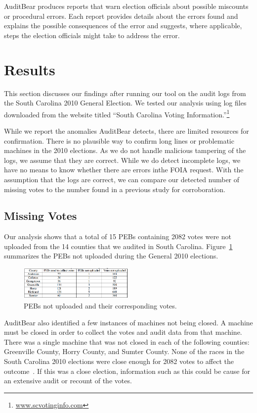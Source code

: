 \documentclass[letterpaper,twocolumn,10pt]{article}
\begin{document}
AuditBear produces reports that warn election officials about possible miscounts
or procedural errors. Each report provides details about the errors found and
explains the possible consequences of the error and suggests, where applicable,
steps the election officials might take to address the error.

\section{Results}
This section discusses our findings after running our tool on the audit logs
from the South Carolina 2010 General Election. We tested our analysis using log
files downloaded from the website titled “South Carolina Voting
Information.”\footnote{\url{www.scvotinginfo.com}} 

While we report the anomalies AuditBear detects, there are limited resources for 
confirmation. There is no plausible way to confirm long lines or problematic 
machines in the 2010 elections. As we do not handle malicious tampering of the 
logs, we assume that they are correct. While we do detect incomplete logs, we 
have no means to know whether there are errors inthe FOIA request. With the 
assumption that the logs are correct, we can compare our detected number of 
missing votes to the number found in a previous study for corroboration.  

\subsection{Missing Votes}
Our analysis shows that a total of 15 PEBs containing 2082 votes were not
uploaded from the 14 counties that we audited in South
Carolina. Figure~\ref{fig:pebs-not-uploaded} summarizes the PEBs not uploaded
during the General 2010 elections.  

\begin{figure}[htbp]
\begin{center}
    \includegraphics[width=0.5\textwidth,height=0.1\textheight]{PEBsNotUploaded1.eps}
\end{center}
\caption{PEBs not uploaded and their corresponding votes.}
\label{fig:pebs-not-uploaded}
\end{figure}

AuditBear also identified a few instances of machines not being closed. A
machine must be closed in order to collect the votes and audit data from that
machine. There was a single machine that was not closed in each of the following
counties: Greenville County, Horry County, and Sumter County. None of the races in 
the South Carolina 2010 elections were close enough for 2082 votes to affect the 
outcome~\cite{http://www.enr-scvotes.org/SC/19077/40477/en/summary.html}. If this 
was a close election, information such as this could be cause for an extensive audit 
or recount of the votes.  
\end{document}

